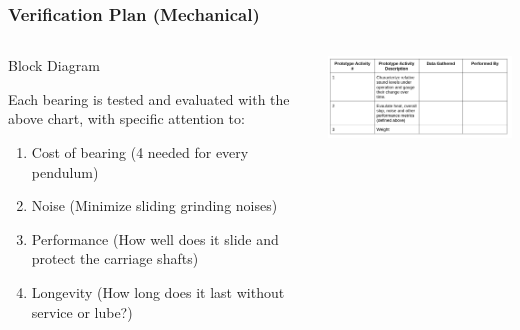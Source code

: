 \documentclass[aspectratio=169]{beamer}
\begin{document}
\begin{frame}
\end{frame}

\begin{frame}
    \frametitle{Verification Plan (Mechanical)}

    \begin{columns}
        \begin{column}{0.40\textwidth}
            \begin{block}{Block Diagram}
                \tiny{
                    Each bearing is tested and evaluated with the above chart, with specific attention to:
                    \begin{enumerate}
                        \item Cost of bearing (4 needed for every pendulum)
                        \item Noise (Minimize sliding grinding noises)
                        \item Performance (How well does it slide and protect the carriage shafts)
                        \item Longevity (How long does it last without service or lube?)
                    \end{enumerate}
                }
            \end{block}
        \end{column}

        \begin{column}{0.58\textwidth}
            \includegraphics[width=8.5cm]{MechanicalPrototype}
        \end{column}
    \end{columns}

\end{frame}
\end{document}
